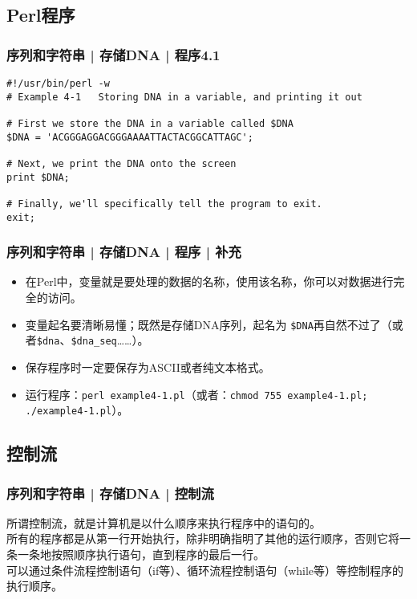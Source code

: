 \subsection{Perl程序}
\begin{frame}[fragile,label=exam4.1]
  \frametitle{序列和字符串 | 存储DNA | \alert{程序4.1}}
\begin{lstlisting}
#!/usr/bin/perl -w
# Example 4-1   Storing DNA in a variable, and printing it out

# First we store the DNA in a variable called $DNA
$DNA = 'ACGGGAGGACGGGAAAATTACTACGGCATTAGC';

# Next, we print the DNA onto the screen
print $DNA;

# Finally, we'll specifically tell the program to exit.
exit;
\end{lstlisting}
\end{frame}

\begin{frame}[fragile]
  \frametitle{序列和字符串 | 存储DNA | 程序 | \alert{补充}}
  \begin{itemize}
    \item 在Perl中，变量就是要处理的数据的名称，使用该名称，你可以对数据进行完全的访问。
    \item 变量起名要清晰易懂；既然是存储DNA序列，起名为 \verb|$DNA|再自然不过了（或者\verb|$dna|、\verb|$dna_seq|……）。
    \item 保存程序时一定要保存为ASCII或者纯文本格式。
    \item 运行程序：\verb|perl example4-1.pl|（或者：\verb|chmod 755 example4-1.pl; ./example4-1.pl|）。
  \end{itemize}
\end{frame}

\subsection{控制流}
\begin{frame}
  \frametitle{序列和字符串 | 存储DNA | 控制流}
  所谓控制流，就是计算机是以什么顺序来执行程序中的语句的。\\
  \vspace{1em}
  所有的程序都是从第一行开始执行，除非明确指明了其他的运行顺序，否则它将一条一条地按照顺序执行语句，直到程序的最后一行。\\
  \vspace{1em}
  可以通过条件流程控制语句（if等）、循环流程控制语句（while等）等控制程序的执行顺序。
\end{frame}

